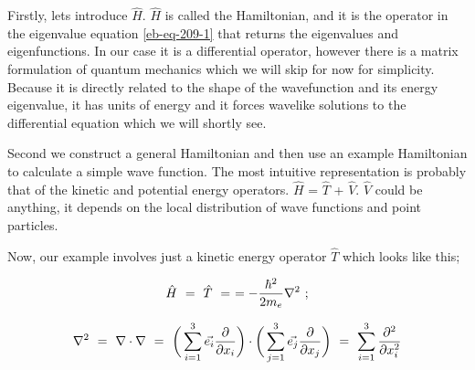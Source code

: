 \documentclass{article}
\newcounter{subsubsubsection}[subsubsection]
\begin{document}
Firstly, lets introduce \begin{math} \hat{H} \end{math}. \begin{math} \hat{H} \end{math} is called the Hamiltonian, and it is the operator in the eigenvalue equation \ref{eb-eq-209-1} that returns the eigenvalues and eigenfunctions. In our case it is a differential operator, however there is a matrix formulation of quantum mechanics which we will skip for now for simplicity. Because it is directly related to the shape of the wavefunction and its energy eigenvalue, it has units of energy and it forces wavelike solutions to the differential equation which we will shortly see. 

Second we construct a general Hamiltonian and then use an example Hamiltonian to calculate a simple wave function. The most intuitive representation is probably that of the kinetic and potential energy operators. \begin{math} \hat{H} \end{math} = \begin{math} \hat{T} \end{math} + \begin{math} \hat{V} \end{math}. \begin{math} \hat{V} \end{math} could be anything, it depends on the local distribution of wave functions and point particles.  

Now, our example involves just a kinetic energy operator \begin{math} \hat{T} \end{math} which looks like this;

\begin{equation} \label{eb-eq-210-1}
\hat{H} \hspace{0.125cm} = \hspace{0.125cm} \hat{T} \hspace{0.125cm} = \hspace{0.125cm} = -\frac{\hbar^2}{2m_{e}}\nabla^2 \hspace{0.125cm} ; 
\end{equation}

\begin{equation} \label{eb-eq-211-1}
\nabla^2 \hspace{0.125cm} = \hspace{0.125cm} \nabla \cdot \nabla \hspace{0.125cm} = \hspace{0.125cm} \bigg( \sum_{i=1}^{3}\vec{e_i}\frac{\partial{}}{\partial{x_i}} \bigg) \cdot \bigg( \sum_{j=1}^{3}\vec{e_j}\frac{\partial{}}{\partial{x_j}} \bigg) \hspace{0.125cm} = \hspace{0.125cm} \sum_{i=1}^{3}\frac{\partial^{2}}{\partial{x_i^2}}
\end{equation}
\end{document}
